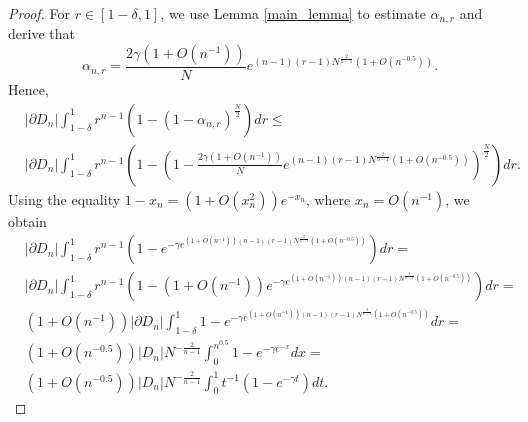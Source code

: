 \documentclass[10pt, twoside, leqno]{article}
\theoremstyle{definition}
\numberwithin{equation}{section}
\newcommand{\E}{{\mathbb{E}}}
\newcommand{\NN}{N^{-\frac 2{n-1} }}
\begin{document}
	\begin{proof}
	For  $r\in [1-\delta,1] $, we use Lemma \ref{main_lemma} to estimate $ \alpha_{n,r} $  and derive that
	\[
	\alpha_{n,r}=\frac{2\gamma\left(1+O\left(n^{-1}\right)\right)}{N}e^{\left(n-1\right)\left(r-1\right)N^{\frac{2}{n-1}}\left(1+O\left(n^{-0.5}\right)\right)}.
	\]  
	Hence,
	\begin{equation*}
	\begin{aligned} & |\partial D_{n}|\int_{1-\delta}^{1}r^{n-1}\left(1-\left(1-\alpha_{n,r}\right)^{\frac{N}{2}}\right)dr\leq\\
	& |\partial D_{n}|\int_{1-\delta}^{1}r^{n-1}\left(1-\left(1-\frac{2\gamma\left(1+O\left(n^{-1}\right)\right)}{N}e^{\left(n-1\right)\left(r-1\right)N^{\frac{2}{n-1}}\left(1+O\left(n^{-0.5}\right)\right)}\right)^{\frac{N}{2}}\right)dr.
	\end{aligned}
	\end{equation*}
	Using the equality $ 1-x_n= \left(1+O\left(x_n^2\right)\right)e^{-x_n} $, where $ x_n = O\left(n^{-1}\right) $, we obtain 
	\begin{equation*}
	\begin{aligned} & |\partial D_{n}|\int_{1-\delta}^{1}r^{n-1}\left(1-e^{-\gamma e^{\left(1+O\left(n^{-1}\right)\right)\left(n-1\right)\left(r-1\right)N^{\frac{2}{n-1}}\left(1+O\left(n^{-0.5}\right)\right)}}\right)dr=\\
	& |\partial D_{n}|\int_{1-\delta}^{1}r^{n-1}\left(1-\left(1+O\left(n^{-1}\right)\right)e^{-\gamma e^{\left(1+O\left(n^{-1}\right)\right)\left(n-1\right)\left(r-1\right)N^{\frac{2}{n-1}}\left(1+O\left(n^{-0.5}\right)\right)}}\right)dr=\\
	& (1+O(n^{-1}))|\partial D_{n}|\int_{1-\delta}^{1}1-e^{-\gamma e^{\left(1+O\left(n^{-1}\right)\right)\left(n-1\right)\left(r-1\right)N^{\frac{2}{n-1}}\left(1+O\left(n^{-0.5}\right)\right)}}dr=\\
	& (1+O(n^{-0.5}))|D_{n}|\NN\int_{0}^{n^{0.5}}1-e^{-\gamma e^{-x}}dx=\\
	& (1+O(n^{-0.5}))|D_{n}|\NN\int_{0}^{1}t^{-1}(1-e^{-\gamma t})dt.
	\end{aligned}
	\end{equation*}

\end{proof}
\end{document}
